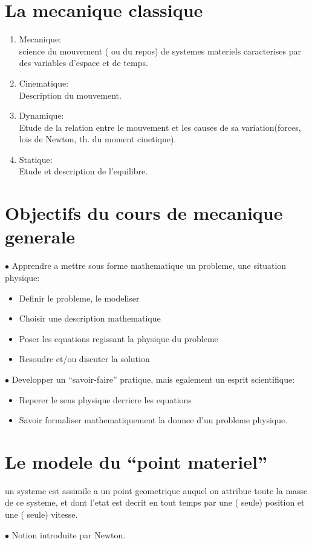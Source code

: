 \documentclass[../main.tex]{subfiles}
\begin{document}
\section{La mecanique classique}
\begin{enumerate}
	\item Mecanique:\\
		science du mouvement ( ou du repos) de systemes materiels caracterises par des variables d'espace et de temps.\\
	\item Cinematique:\\
		Description du mouvement.\\
	\item Dynamique:\\
		Etude de la relation entre le mouvement et les causes de sa variation(forces, lois de Newton, th. du moment cinetique).\\
\item Statique:\\
	Etude et description de l'equilibre.
\end{enumerate}
\section{Objectifs du cours de mecanique generale}
$\bullet$ Apprendre a mettre sous forme mathematique un probleme, une situation physique:
\begin{itemize}
	\item Definir le probleme, le modeliser\\
	\item Choisir une description mathematique\\
	\item Poser les equations regissant la physique du probleme\\
	\item Resoudre et/ou discuter la solution
\end{itemize}
$\bullet$ Developper un ``savoir-faire''  pratique, mais egalement un esprit scientifique:
\begin{itemize}
	\item Reperer le sens physique derriere les equations\\
	\item Savoir formaliser mathematiquement la donnee d'un probleme physique.
\end{itemize}

\section{Le modele du ``point materiel'' }
\begin{defn}\label{defn:point_materiel}
	un systeme est assimile a un point geometrique auquel on attribue toute la masse de ce systeme, et dont l'etat est decrit en tout temps par une ( seule) position et une ( seule) vitesse.
\end{defn}
$\bullet$ Notion introduite par Newton.\\
\end{document}

